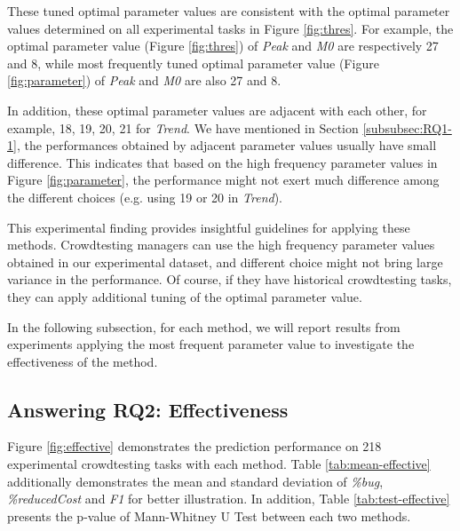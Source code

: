 \documentclass[sigconf,review, anonymous]{acmart}
\begin{document}
These tuned optimal parameter values are consistent with the optimal parameter values determined on all experimental tasks in Figure \ref{fig:thres}.
For example, the optimal parameter value (Figure \ref{fig:thres}) of \textit{Peak} and \textit{M0} are respectively 27 and 8, while most frequently tuned optimal parameter value (Figure \ref{fig:parameter}) of \textit{Peak} and \textit{M0} are also 27 and 8.


In addition, these optimal parameter values are adjacent with each other, for example, 18, 19, 20, 21 for \textit{Trend}.
We have mentioned in Section \ref{subsubsec:RQ1-1}, the performances obtained by adjacent parameter values usually have small difference.
This indicates that based on the high frequency parameter values in Figure \ref{fig:parameter}, the performance might not exert much difference among the different choices (e.g. using 19 or 20 in \textit{Trend}).

This experimental finding provides insightful guidelines for applying these methods.
Crowdtesting managers can use the high frequency parameter values obtained in our experimental dataset, and different choice might not bring large variance in the performance. Of course, if they have historical crowdtesting tasks, they can apply additional tuning of the optimal parameter value.







In the following subsection, for each method, we will report results from experiments applying the most frequent parameter value to investigate the effectiveness of the method.

\subsection{Answering RQ2: Effectiveness}
\label{subsec:RQ2}






Figure \ref{fig:effective} demonstrates the prediction performance on 218 experimental crowdtesting tasks with each method.
Table \ref{tab:mean-effective} additionally demonstrates the mean and standard deviation of \textit{\%bug}, \textit{\%reducedCost} and \textit{F1} for better illustration.
In addition, Table \ref{tab:test-effective} presents the p-value of Mann-Whitney U Test between each two methods.
\end{document}
